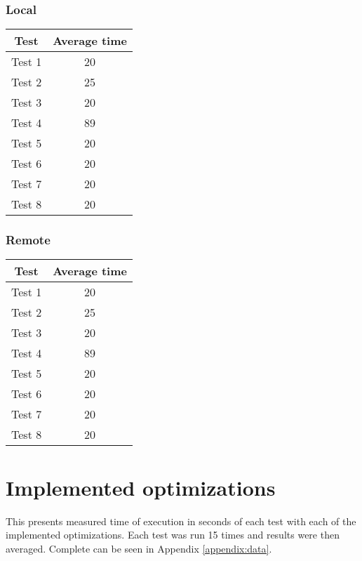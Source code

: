\subsubsection{Local}

\begin{center}
    \begin{tabular}{| c | c |}
    \hline
    Test & Average time\\ \hline
    Test 1 & 20 \\ \hline
    Test 2 & 25 \\ \hline
    Test 3 & 20 \\ \hline
    Test 4 & 89 \\ \hline
    Test 5 & 20 \\ \hline
    Test 6 & 20 \\ \hline
    Test 7 & 20 \\ \hline
    Test 8 & 20 \\ \hline
    \end{tabular}
\end{center}

\subsubsection{Remote}
\begin{center}
    \begin{tabular}{| c | c |}
    \hline
    Test & Average time \\ \hline
    Test 1 & 20 \\ \hline
    Test 2 & 25 \\ \hline
    Test 3 & 20 \\ \hline
    Test 4 & 89 \\ \hline
    Test 5 & 20 \\ \hline
    Test 6 & 20 \\ \hline
    Test 7 & 20 \\ \hline
    Test 8 & 20 \\ \hline
    \end{tabular}
\end{center}


\section{Implemented optimizations}
This presents measured time of execution in seconds of each test with each of the implemented optimizations. Each test was run 15 times and results were then averaged. Complete can be seen in Appendix \ref{appendix:data}.

